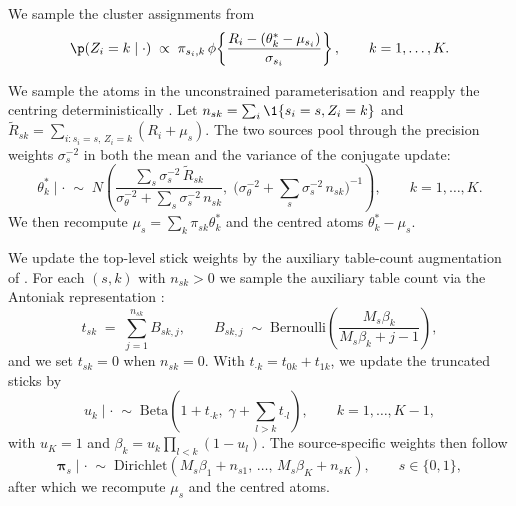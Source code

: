 We sample the cluster assignments from
\begin{equation}
\p(Z_i = k \mid \cdot) \;\propto\; \pi_{s_i, k}\, \phi\!\left\{\frac{R_i - (\theta_k^* - \mu_{s_i})}{\sigma_{s_i}}\right\}, \qquad k = 1, \ldots, K.
\label{eq:sm-cluster}
\end{equation}

We sample the atoms in the unconstrained parameterisation and reapply the centring deterministically \citep{yang2010semiparametric}.
Let $n_{sk} = \sum_i \1\{s_i = s, Z_i = k\}$ and $\tilde R_{sk} = \sum_{i : s_i = s,\, Z_i = k} (R_i + \mu_s)$.
The two sources pool through the precision weights $\sigma_s^{-2}$ in both the mean and the variance of the conjugate update:
\begin{equation}
\theta_k^* \mid \cdot \;\sim\; N\!\left(\frac{\sum_{s} \sigma_s^{-2}\, \tilde R_{sk}}{\sigma_\theta^{-2} + \sum_{s} \sigma_s^{-2}\, n_{sk}},\; \bigl(\sigma_\theta^{-2} + \sum_{s} \sigma_s^{-2}\, n_{sk}\bigr)^{-1}\right), \qquad k = 1, \ldots, K.
\label{eq:sm-atoms}
\end{equation}
We then recompute $\mu_s = \sum_k \pi_{sk} \theta_k^*$ and the centred atoms $\theta_k^* - \mu_s$.

We update the top-level stick weights by the auxiliary table-count augmentation of \citet{teh2006hierarchical}.
For each $(s, k)$ with $n_{sk} > 0$ we sample the auxiliary table count via the Antoniak representation \citep{antoniak1974mixtures}:
\begin{equation}
t_{sk} \;=\; \sum_{j=1}^{n_{sk}} B_{sk,j}, \qquad B_{sk,j} \;\sim\; \mathrm{Bernoulli}\!\left(\frac{M_s \beta_k}{M_s \beta_k + j - 1}\right),
\end{equation}
and we set $t_{sk} = 0$ when $n_{sk} = 0$.
With $t_{\cdot k} = t_{0k} + t_{1k}$, we update the truncated sticks by
\begin{equation}
u_k \mid \cdot \;\sim\; \mathrm{Beta}\!\left(1 + t_{\cdot k},\; \gamma + \sum_{l > k} t_{\cdot l}\right), \qquad k = 1, \ldots, K - 1,
\end{equation}
with $u_K = 1$ and $\beta_k = u_k \prod_{l < k}(1 - u_l)$.
The source-specific weights then follow
\begin{equation}
\bm{\pi}_s \mid \cdot \;\sim\; \mathrm{Dirichlet}(M_s \beta_1 + n_{s1},\, \ldots,\, M_s \beta_K + n_{sK}), \qquad s \in \{0, 1\},
\end{equation}
after which we recompute $\mu_s$ and the centred atoms.

